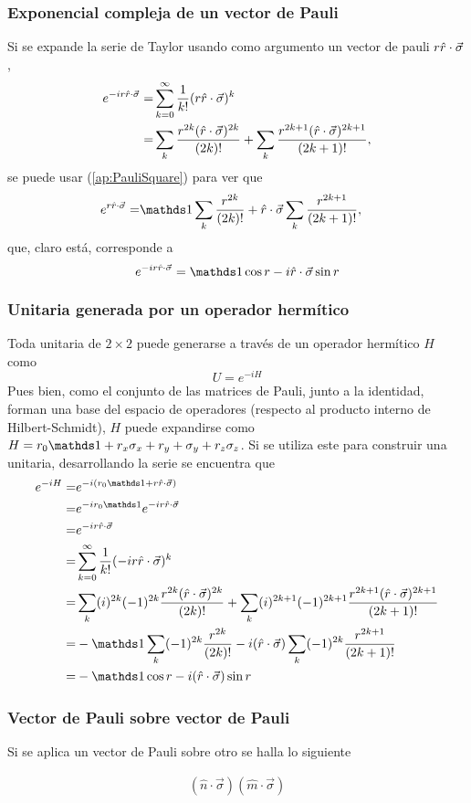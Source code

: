 \subsubsection{Exponencial compleja de un vector de Pauli}
Si se expande la serie de Taylor usando como argumento un vector de pauli $r\hat{r}\cdot\vec{\sigma}$,
\begin{align*}
    e^{-ir\hat{r}\cdot\vec{\sigma}}=&\sum_{k=0}^{\infty}\frac{1}{k!}(r\hat{r}\cdot\vec{\sigma})^k\\
    =&\sum_{k}\frac{r^{2k}(\hat{r}\cdot\vec{\sigma})^{2k}}{(2k)!}+\sum_{k}\frac{r^{2k+1}(\hat{r}\cdot\vec{\sigma})^{2k+1}}{(2k+1)!},
\end{align*}
se puede usar (\ref{ap:PauliSquare}) para ver que
\begin{align*}
    e^{r\paulivec{r}}=&\Id\sum_{k}\frac{r^{2k}}{(2k)!}+\paulivec{r}\sum_{k}\frac{r^{2k+1}}{(2k+1)!},
\end{align*}
que, claro está, corresponde a
\begin{equation}\label{ap:PauliCompExp}
    e^{-ir\paulivec{r}}=\Id\cos{r}-i\paulivec{r}\sin{r}
\end{equation}
\subsubsection{Unitaria generada por un operador hermítico}
Toda unitaria de $2\times 2$ puede generarse a través de un operador hermítico $H$ como
\begin{equation*}
    U=e^{-iH}
\end{equation*}
Pues bien, como el conjunto de las matrices de Pauli, junto a la identidad, forman una base del espacio de operadores (respecto al producto interno de Hilbert-Schmidt), $H$ puede expandirse como $H=r_{0}\Id+r_{x}\pauli{x}+r_{y}+\pauli{y}+r_{z}\pauli{z}$. Si se utiliza este para construir una unitaria, desarrollando la serie se encuentra que
\begin{align*}
    e^{-iH}=&e^{-i(r_{0}\Id+r\paulivec{r})}\\
    =&e^{-i r_{0}\Id}e^{-ir\paulivec{r}}\\
    =&e^{-ir\paulivec{r}}\\
    =&\sum_{k=0}^{\infty}\frac{1}{k!}(-ir\paulivec{r})^k\\
    =&\sum_{k}(i)^{2k}(-1)^{2k}\frac{r^{2k}(\paulivec{r})^{2k}}{(2k)!}+\sum_{k}(i)^{2k+1}(-1)^{2k+1}\frac{r^{2k+1}(\paulivec{r})^{2k+1}}{(2k+1)!}\\
    =&-\Id\sum_{k}(-1)^{2k}\frac{r^{2k}}{(2k)!}-i(\paulivec{r})\sum_{k}(-1)^{2k}\frac{r^{2k+1}}{(2k+1)!}\\
    =&-\Id \cos{r}-i(\paulivec{r})\sin{r}
\end{align*}
\subsubsection{Vector de Pauli sobre vector de Pauli}
Si se aplica un vector de Pauli sobre otro se halla lo siguiente

\begin{align*}
    (\hat{n}\cdot\vec{\sigma})(\hat{m}\cdot\vec{\sigma})
\end{align*}
